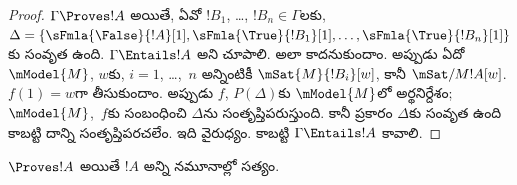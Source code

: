 \documentclass[../../../include/open-logic-section]{subfiles}
\begin{document}
\begin{proof}
  $\Gamma \Proves !A$ అయితే, ఏవో
  $!B_1$, \dots, $!B_n \in
  \Gamma$లకు, $\Delta =
  \{\sFmla{\False}{!A}[1], \sFmla{\True}{!B_1}[1],
  \dots, \sFmla{\True}{!B_n}[1]\}$కు
  సంవృత 
  ఉంది. $\Gamma \Entails !A$ అని
  చూపాలి. అలా కాదనుకుందాం. అప్పుడు
  ఏదో $\mModel{M}$, $w$కు,
  $i=1$, \dots,~$n$ అన్నింటికీ
  $\mSat{M}{!B_i}[w]$, కానీ
  $\mSat/{M}{!A}[w]$.
  $f(1) = w$గా తీసుకుందాం. అప్పుడు
  $f$, $P(\Delta)$కు $\mModel{M}$లో
  అర్థనిర్దేశం; $\mModel{M}$,~$f$కు
  సంబంధించి $\Delta$ను
  సంతృప్తిపరుస్తుంది. కానీ
  ప్రకారం $\Delta$కు సంవృత
  ఉంది కాబట్టి దాన్ని సంతృప్తిపరచలేం.
  ఇది వైరుధ్యం. కాబట్టి
  $\Gamma \Entails !A$ కావాలి.
\end{proof}

\begin{cor}
$\Proves !A$ అయితే
$!A$ అన్ని నమూనాల్లో సత్యం.
\end{cor}
\end{document}
